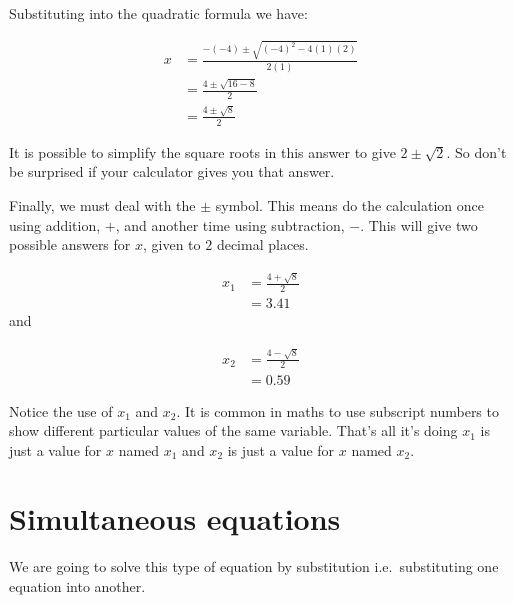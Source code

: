 \documentclass[
  a4paper,
]{scrbook}
\begin{document}
Substituting into the quadratic formula we have:

\[
\begin{aligned} x &= \frac{-(-4) \pm \sqrt{(-4)^2-4(1)(2)}}{2(1)} \\
&= \frac{4 \pm \sqrt{16-8}}{2} \\
&= \frac{4 \pm \sqrt{8}}{2}
\end{aligned}
\]

It is possible to simplify the square roots in this answer to give
\(2 \pm \sqrt{2}\). So don't be surprised if your calculator gives you
that answer.

Finally, we must deal with the \(\pm\) symbol. This means do the
calculation once using addition, \(+\), and another time using
subtraction, \(-\). This will give two possible answers for \(x\), given
to \(2\) decimal places.

\[
\begin{aligned} x_1 &= \frac{4 + \sqrt{8}}{2} \\
&= 3.41
\end{aligned}
\] and

\[
\begin{aligned} x_2 &= \frac{4 - \sqrt{8}}{2} \\
&= 0.59
\end{aligned}
\]

\begin{tcolorbox}[enhanced jigsaw, arc=.35mm, bottomrule=.15mm, bottomtitle=1mm, breakable, colback=white, colbacktitle=quarto-callout-tip-color!10!white, colframe=quarto-callout-tip-color-frame, coltitle=black, left=2mm, leftrule=.75mm, opacityback=0, opacitybacktitle=0.6, rightrule=.15mm, title=\textcolor{quarto-callout-tip-color}{\faLightbulb}\hspace{0.5em}{Pro tip}, titlerule=0mm, toprule=.15mm, toptitle=1mm]

Notice the use of \(x_1\) and \(x_2\). It is common in maths to use
subscript numbers to show different particular values of the same
variable. That's all it's doing \(x_1\) is just a value for \(x\) named
\(x_1\) and \(x_2\) is just a value for \(x\) named \(x_2\).

\end{tcolorbox}

\section{Simultaneous equations}\label{simultaneous-equations-1}

We are going to solve this type of equation by substitution
i.e.~substituting one equation into another.
\end{document}
